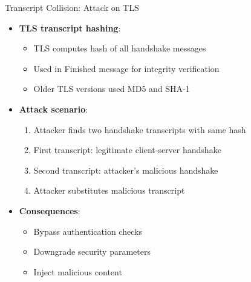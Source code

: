 \documentclass[aspectratio=169, lualatex, handout]{beamer}
\begin{document}
\begin{frame}{Transcript Collision: Attack on TLS}
	\begin{itemize}
		\item \textbf{TLS transcript hashing}:
		      \begin{itemize}
			      \item TLS computes hash of all handshake messages
			      \item Used in Finished message for integrity verification
			      \item Older TLS versions used MD5 and SHA-1
		      \end{itemize}
		\item \textbf{Attack scenario}:
		      \begin{enumerate}
			      \item Attacker finds two handshake transcripts with same hash
			      \item First transcript: legitimate client-server handshake
			      \item Second transcript: attacker's malicious handshake
			      \item Attacker substitutes malicious transcript
		      \end{enumerate}
		\item \textbf{Consequences}:
		      \begin{itemize}
			      \item Bypass authentication checks
			      \item Downgrade security parameters
			      \item Inject malicious content
		      \end{itemize}
	\end{itemize}
\end{frame}
\end{document}
